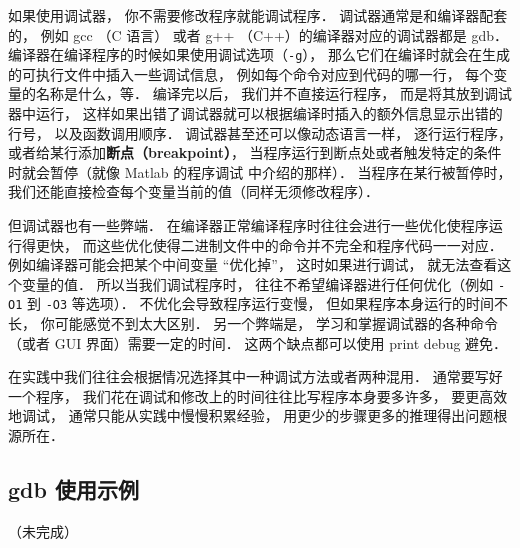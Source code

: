 如果使用调试器， 你不需要修改程序就能调试程序． 调试器通常是和编译器配套的， 例如 gcc （C 语言） 或者 g++ （C++）的编译器对应的调试器都是 gdb． 编译器在编译程序的时候如果使用调试选项（\verb|-g|）， 那么它们在编译时就会在生成的可执行文件中插入一些调试信息， 例如每个命令对应到代码的哪一行， 每个变量的名称是什么，等． 编译完以后， 我们并不直接运行程序， 而是将其放到调试器中运行， 这样如果出错了调试器就可以根据编译时插入的额外信息显示出错的行号， 以及函数调用顺序． 调试器甚至还可以像动态语言一样， 逐行运行程序， 或者给某行添加\textbf{断点（breakpoint）}， 当程序运行到断点处或者触发特定的条件时就会暂停（就像 Matlab 的程序调试 中介绍的那样）． 当程序在某行被暂停时， 我们还能直接检查每个变量当前的值（同样无须修改程序）．

但调试器也有一些弊端． 在编译器正常编译程序时往往会进行一些优化使程序运行得更快， 而这些优化使得二进制文件中的命令并不完全和程序代码一一对应． 例如编译器可能会把某个中间变量 “优化掉”， 这时如果进行调试， 就无法查看这个变量的值． 所以当我们调试程序时， 往往不希望编译器进行任何优化（例如 \verb|-O1| 到 \verb|-O3| 等选项）． 不优化会导致程序运行变慢， 但如果程序本身运行的时间不长， 你可能感觉不到太大区别． 另一个弊端是， 学习和掌握调试器的各种命令（或者 GUI 界面）需要一定的时间． 这两个缺点都可以使用 print debug 避免．

在实践中我们往往会根据情况选择其中一种调试方法或者两种混用． 通常要写好一个程序， 我们花在调试和修改上的时间往往比写程序本身要多许多， 要更高效地调试， 通常只能从实践中慢慢积累经验， 用更少的步骤更多的推理得出问题根源所在．

\subsection{gdb 使用示例}

（未完成）
